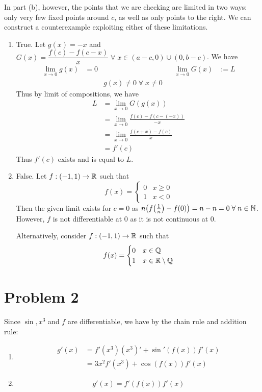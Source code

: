 \documentclass[12pt]{article}
\begin{document}
In part (b), however, the points that we are checking are limited in two ways: only very few fixed points around $c$, as well as only points to the right.
We can construct a counterexample exploiting either of these limitations.
\begin{enumerate}[label=(\alph*)]
    \item True. Let $g(x) = -x$ and $G(x) = \dfrac{f(c) - f(c - x)}{x} \;\forall\; x \in (a - c, 0) \cup (0, b - c)$. We have
    \begin{align*}
        \lim_{x \to 0} g(x) &= 0 & & & \lim_{x \to 0} G(x) &:= L \\
        && g(x) \neq 0 \;\forall\; x \neq 0
    \end{align*}
    Thus by limit of compositions, we have
    \begin{align*}
        L &= \lim_{x \to 0} G(g(x)) \\
        &= \lim_{x \to 0} \frac{f(c) - f(c - (-x))}{-x} \\
        &= \lim_{x \to 0} \frac{f(c + x) - f(c)}{x} \\
        &= f'(c)
    \end{align*}
    Thus $f'(c)$ exists and is equal to $L$.

    \item False. Let $f: (-1, 1) \to \mathbb{R}$ such that \[
        f(x) = 
        \begin{cases}
            0 & x \geq 0 \\
            1 & x < 0
        \end{cases}
    \] Then the given limit exists for $c = 0$ as $n \paren{f\paren{\frac{1}{n}} - f(0)} = n - n = 0 \;\forall\; n \in \N$.
    However, $f$ is not differentiable at 0 as it is not continuous at 0.
    
    Alternatively, consider $f: (-1, 1) \to \mathbb{R}$ such that \[
        f(x) = 
        \begin{cases}
            0 & x \in \mathbb{Q} \\
            1 & x \in \mathbb{R} \setminus \mathbb{Q}
        \end{cases}
    \]
\end{enumerate}

\section*{Problem 2}
Since $\sin, x^{3}$ and $f$ are differentiable, we have by the chain rule and addition rule:
\begin{enumerate}[label=(\alph*)]
    \item 
    \begin{align*}
        g'(x) &= f'(x^{3}) (x^{3})' + \sin'(f(x)) f'(x) \\
        &= 3x^{2} f'(x^{3}) + \cos(f(x)) f'(x)
    \end{align*}

    \item 
    \begin{align*}
        g'(x) = f'(f(x)) f'(x)
    \end{align*}
\end{enumerate}
\end{document}
